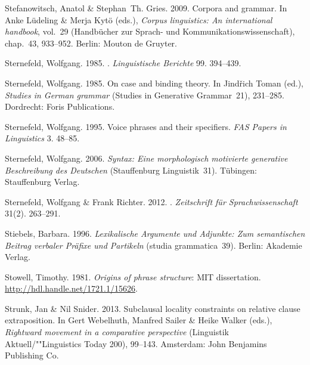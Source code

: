 \begin{thebibliography}{1420}
Stefanowitsch, Anatol \& Stephan~Th. Gries. 2009.
\newblock Corpora and grammar.
\newblock In Anke L{\"u}deling \& Merja Kyt{\"o} (eds.), \emph{Corpus
  linguistics: {An} international handbook}, vol.~29  (Hand\-b{\"u}\-cher zur
  Sprach- und Kommunikationswissenschaft), chap.~43, 933--952. Berlin: Mouton
  de Gruyter.

Sternefeld, Wolfgang. 1985{}.
.
\newblock \emph{Linguistische Berichte} 99. 394--439.

Sternefeld, Wolfgang. 1985{}.
\newblock On case and binding theory.
\newblock In Jind\v{r}ich Toman (ed.), \emph{Studies in {German} grammar}
  (Studies in Generative Grammar~21), 231--285. Dordrecht: Foris Publications.

Sternefeld, Wolfgang. 1995.
\newblock Voice phrases and their specifiers.
\newblock \emph{FAS Papers in Linguistics} 3. 48--85.

Sternefeld, Wolfgang. 2006.
\newblock \emph{{Syntax: Eine morphologisch motivierte generative Beschreibung
  des Deutschen}} (Stauffenburg Linguistik~31).
\newblock T{\"u}bingen: Stauffenburg Verlag.

Sternefeld, Wolfgang \& Frank Richter. 2012.
.
\newblock \emph{Zeitschrift f{\"u}r Sprachwissenschaft} 31(2). 263--291.

Stiebels, Barbara. 1996.
\newblock \emph{{Lexikalische Argumente und Adjunkte: Zum semantischen Beitrag
  verbaler Pr{\"a}fixe und Partikeln}} (studia grammatica~39).
\newblock Berlin: Akademie Verlag.

Stowell, Timothy. 1981.
\newblock \emph{Origins of phrase structure}: MIT dissertation.
\newblock \urlprefix\url{http://hdl.handle.net/1721.1/15626}.

Strunk, Jan \& Nil Snider. 2013.
\newblock Subclausal locality constraints on relative clause extraposition.
\newblock In Gert Webelhuth, Manfred Sailer \& Heike Walker (eds.),
  \emph{Rightward movement in a comparative perspective} (Linguistik
  Aktuell/""Linguistics Today 200), 99--143. Amsterdam: John Benjamins
  Publishing Co.


\end{thebibliography}

